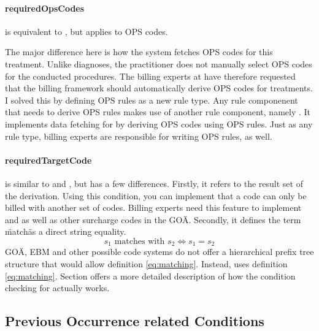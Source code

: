 \paragraph{requiredOpsCodes}

 is equivalent to , but applies to OPS codes.

The major difference here is how the system fetches OPS codes for this treatment.
Unlike diagnoses, the practitioner does not manually select OPS codes for the conducted procedures.
The billing experts at \AV have therefore requested that the billing framework should automatically derive OPS codes for treatments.
I solved this by defining OPS rules as a new rule type.
Any rule componenent that needs to derive OPS rules makes use of another rule component, namely .
It implements data fetching for  by deriving OPS codes using OPS rules.
Just as any rule type, billing experts are responsible for writing OPS rules, as well.

\paragraph{requiredTargetCode}

 is similar to  and , but has a few differences.
Firstly, it refers to the result set of the derivation.
Using this condition, you can implement that a code can only be billed with another set of codes.
Billing experts need this feature to implement  and  as well as other surcharge codes in the GOÄ.
Secondly, it defines the term \"match\" as a direct string equality.
\begin{equation}\label{eq:matching-string-equals}
s_1 \text{ matches with } s_2 \iff s_1 = s_2
\end{equation}
GOÄ, EBM and other possible code systems do not offer a hierarchical prefix tree structure that would allow definition \ref{eq:matching}.
Instead,  uses definition \ref{eq:matching}.
Section \addref offers a more detailed description of how the condition checking for  actually works.

\subsection{Previous Occurrence related Conditions}\label{subsubsec:previous-occurrence-related}

